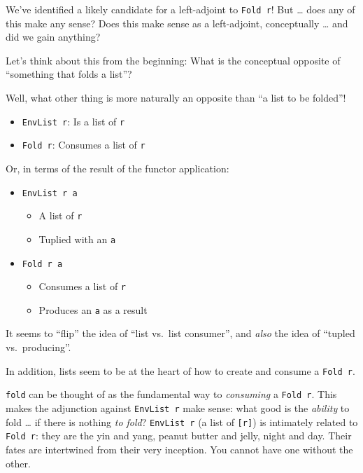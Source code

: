 \documentclass[]{article}
\begin{document}
We've identified a likely candidate for a left-adjoint to \texttt{Fold\ r}! But
\ldots{} does any of this make any sense? Does this make sense as a
left-adjoint, conceptually \ldots{} and did we gain anything?

Let's think about this from the beginning: What is the conceptual opposite of
``something that folds a list''?

Well, what other thing is more naturally an opposite than ``a list to be
folded''!

\begin{itemize}
\tightlist
\item
  \texttt{EnvList\ r}: Is a list of \texttt{r}
\item
  \texttt{Fold\ r}: Consumes a list of \texttt{r}
\end{itemize}

Or, in terms of the result of the functor application:

\begin{itemize}
\tightlist
\item
  \texttt{EnvList\ r\ a}

  \begin{itemize}
  \tightlist
  \item
    A list of \texttt{r}
  \item
    Tuplied with an \texttt{a}
  \end{itemize}
\item
  \texttt{Fold\ r\ a}

  \begin{itemize}
  \tightlist
  \item
    Consumes a list of \texttt{r}
  \item
    Produces an \texttt{a} as a result
  \end{itemize}
\end{itemize}

It seems to ``flip'' the idea of ``list vs.~list consumer'', and \emph{also} the
idea of ``tupled vs.~producing''.

In addition, lists seem to be at the heart of how to create and consume a
\texttt{Fold\ r}.

\texttt{fold} can be thought of as the fundamental way to \emph{consuming} a
\texttt{Fold\ r}. This makes the adjunction against \texttt{EnvList\ r} make
sense: what good is the \emph{ability} to fold \ldots{} if there is nothing
\emph{to fold}? \texttt{EnvList\ r} (a list of \texttt{{[}r{]}}) is intimately
related to \texttt{Fold\ r}: they are the yin and yang, peanut butter and jelly,
night and day. Their fates are intertwined from their very inception. You cannot
have one without the other.
\end{document}

